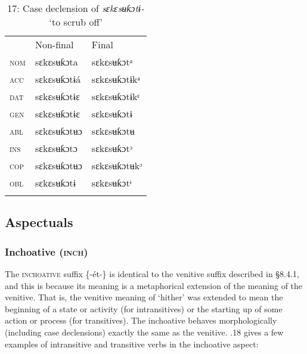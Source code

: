 \begin{table}
\caption{17: Case declension of \textit{sɛkɛsʉƙɔtɨ-} ‘to scrub off’}
\label{tab:8}


\begin{tabularx}{\textwidth}{XXX} & Non-final & Final\\
\lsptoprule
\textsc{nom} & sɛkɛsʉƙɔta & sɛkɛsʉƙɔtᵃ\\
\textsc{acc} & sɛkɛsʉƙɔtɨá & sɛkɛsʉƙɔtɨkᵃ\\
\textsc{dat} & sɛkɛsʉƙɔtɨɛ & sɛkɛsʉƙɔtɨkᵋ\\
\textsc{gen} & sɛkɛsʉƙɔtɨɛ & sɛkɛsʉƙɔtɨ\\
\textsc{abl} & sɛkɛsʉƙɔtʉɔ & sɛkɛsʉƙɔtʉ\\
\textsc{ins} & sɛkɛsʉƙɔtɔ & sɛkɛsʉƙɔtᵓ\\
\textsc{cop} & sɛkɛsʉƙɔtʉɔ & sɛkɛsʉƙɔtʉkᵓ\\
\textsc{obl} & sɛkɛsʉƙɔtɨ & sɛkɛsʉƙɔtᶤ\\
\lspbottomrule
\end{tabularx}
\end{table}



\subsection{Aspectuals}
\subsubsection{Inchoative (\textsc{inch})}

The \textsc{inchoative} suffix \{-ét-\} is identical to the venitive suffix described in §8.4.1, and this is because its meaning is a metaphorical extension of the meaning of the venitive. That is, the venitive meaning of ‘hither’ was extended to mean the beginning of a state or activity (for intransitives) or the starting up of some action or process (for transitives). The inchoative behaves morphologically (including case declensions) exactly the same as the venitive. .18 gives a few examples of intransitive and transitive verbs in the inchoative aspect:


